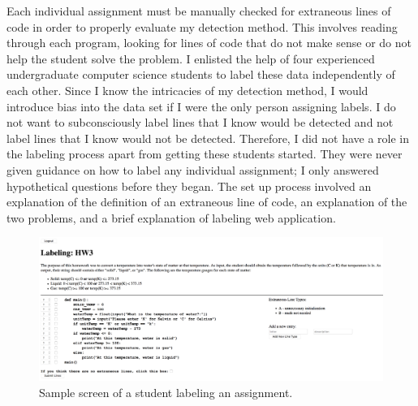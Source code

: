 Each individual assignment must be manually checked for extraneous lines of code in order to properly evaluate my detection method. This involves reading through each program, looking for lines of code that do not make sense or do not help the student solve the problem. I enlisted the help of four experienced undergraduate computer science students to label these data independently of each other. Since I know the intricacies of my detection method, I would introduce bias into the data set if I were the only person assigning labels. I do not want to subconsciously label lines that I know would be detected and not label lines that I know would not be detected. Therefore, I did not have a role in the labeling process apart from getting these students started. They were never given guidance on how to label any individual assignment; I only answered hypothetical questions before they began. The set up process involved an explanation of the definition of an extraneous line of code, an explanation of the two problems, and a brief explanation of labeling web application.

\begin{figure}[ht]
  \includegraphics[width=\textwidth]{figures/webapp}
  \caption{Sample screen of a student labeling an assignment.}
  \label{fig:webapp}
\end{figure}

